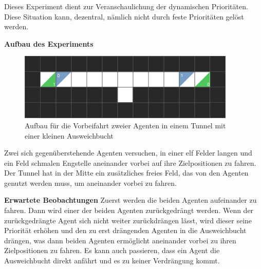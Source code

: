 Dieses Experiment dient zur Veranschaulichung der dynamischen Prioritäten. Diese Situation kann, dezentral, nämlich nicht durch feste Prioritäten gelöst werden.

\textbf{Aufbau des Experiments}
\begin{figure}[H]
    \includegraphics[height=32mm]{images/tunnel_turnout.png}
    \centering
    \caption{Aufbau für die Vorbeifahrt zweier Agenten in einem Tunnel mit einer kleinen Ausweichbucht}
    \label{fig:ausweichbucht}
\end{figure}
Zwei sich gegenüberstehende Agenten versuchen, in einer elf Felder langen und ein Feld schmalen Engstelle aneinander vorbei auf ihre Zielpositionen zu fahren. Der Tunnel hat in der Mitte ein zusätzliches freies Feld, das von den Agenten genutzt werden muss, um aneinander vorbei zu fahren.

\textbf{Erwartete Beobachtungen}\newline
Zuerst werden die beiden Agenten aufeinander zu fahren. Dann wird einer der beiden Agenten zurückgedrängt werden. Wenn der zurückgedrängte Agent sich nicht weiter zurückdrängen lässt, wird dieser seine Priorität erhöhen und den zu erst drängenden Agenten in die Ausweichbucht drängen, was dann beiden Agenten ermöglicht aneinander vorbei zu ihren Zielpositionen zu fahren. Es kann auch passieren, dass ein Agent die Ausweichbucht direkt anfährt und es zu keiner Verdrängung kommt.